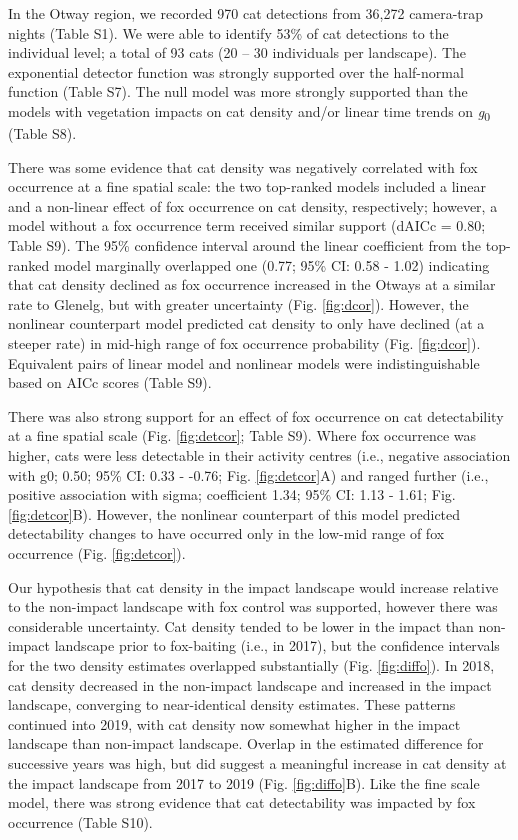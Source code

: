 \documentclass[]{elsarticle} %
\begin{document}
In the Otway region, we recorded 970 cat detections from 36,272 camera-trap nights (Table S1). We were able to identify 53\% of cat detections to the individual level; a total of 93 cats (20 -- 30 individuals per landscape). The exponential detector function was strongly supported over the half-normal function (Table S7). The null model was more strongly supported than the models with vegetation impacts on cat density and/or linear time trends on \emph{g}\textsubscript{0} (Table S8).

There was some evidence that cat density was negatively correlated with fox occurrence at a fine spatial scale: the two top-ranked models included a linear and a non-linear effect of fox occurrence on cat density, respectively; however, a model without a fox occurrence term received similar support (dAICc = 0.80; Table S9). The 95\% confidence interval around the linear coefficient from the top-ranked model marginally overlapped one (0.77; 95\% CI: 0.58 - 1.02) indicating that cat density declined as fox occurrence increased in the Otways at a similar rate to Glenelg, but with greater uncertainty (Fig. \ref{fig:dcor}). However, the nonlinear counterpart model predicted cat density to only have declined (at a steeper rate) in mid-high range of fox occurrence probability (Fig. \ref{fig:dcor}). Equivalent pairs of linear model and nonlinear models were indistinguishable based on AICc scores (Table S9).

There was also strong support for an effect of fox occurrence on cat detectability at a fine spatial scale (Fig. \ref{fig:detcor}; Table S9). Where fox occurrence was higher, cats were less detectable in their activity centres (i.e., negative association with g0; 0.50; 95\% CI: 0.33 - -0.76; Fig. \ref{fig:detcor}A) and ranged further (i.e., positive association with sigma; coefficient 1.34; 95\% CI: 1.13 - 1.61; Fig. \ref{fig:detcor}B). However, the nonlinear counterpart of this model predicted detectability changes to have occurred only in the low-mid range of fox occurrence (Fig. \ref{fig:detcor}).

Our hypothesis that cat density in the impact landscape would increase relative to the non-impact landscape with fox control was supported, however there was considerable uncertainty. Cat density tended to be lower in the impact than non-impact landscape prior to fox-baiting (i.e., in 2017), but the confidence intervals for the two density estimates overlapped substantially (Fig. \ref{fig:diffo}). In 2018, cat density decreased in the non-impact landscape and increased in the impact landscape, converging to near-identical density estimates. These patterns continued into 2019, with cat density now somewhat higher in the impact landscape than non-impact landscape. Overlap in the estimated difference for successive years was high, but did suggest a meaningful increase in cat density at the impact landscape from 2017 to 2019 (Fig. \ref{fig:diffo}B). Like the fine scale model, there was strong evidence that cat detectability was impacted by fox occurrence (Table S10).
\end{document}
